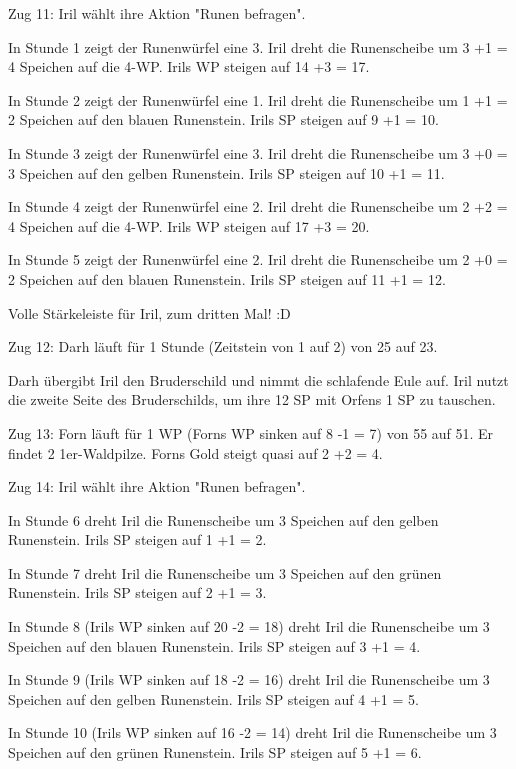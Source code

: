 \documentclass[10pt, a4paper, oneside]{book}
\begin{document}
{Zug 11: Iril wählt ihre Aktion "Runen befragen".

In Stunde 1 zeigt der Runenwürfel eine 3. Iril dreht die Runenscheibe um 3 +1 = 4 Speichen auf die 4-WP. Irils WP steigen auf 14 +3 = 17.

In Stunde 2 zeigt der Runenwürfel eine 1. Iril dreht die Runenscheibe um 1 +1 = 2 Speichen auf den blauen Runenstein. Irils SP steigen auf 9 +1 = 10.

In Stunde 3 zeigt der Runenwürfel eine 3. Iril dreht die Runenscheibe um 3 +0 = 3 Speichen auf den gelben Runenstein. Irils SP steigen auf 10 +1 = 11.

In Stunde 4 zeigt der Runenwürfel eine 2. Iril dreht die Runenscheibe um 2 +2 = 4 Speichen auf die 4-WP. Irils WP steigen auf 17 +3 = 20.

In Stunde 5 zeigt der Runenwürfel eine 2. Iril dreht die Runenscheibe um 2 +0 = 2 Speichen auf den blauen Runenstein. Irils SP steigen auf 11 +1 = 12.

Volle Stärkeleiste für Iril, zum dritten Mal! :D



Zug 12: Darh läuft für 1 Stunde (Zeitstein von 1 auf 2) von 25 auf 23.

Darh übergibt Iril den Bruderschild und nimmt die schlafende Eule auf. Iril nutzt die zweite Seite des Bruderschilds, um ihre 12 SP mit Orfens 1 SP zu tauschen.



Zug 13: Forn läuft für 1 WP (Forns WP sinken auf 8 -1 = 7) von 55 auf 51. Er findet 2 1er-Waldpilze. Forns Gold steigt quasi auf 2 +2 = 4.



Zug 14: Iril wählt ihre Aktion "Runen befragen".

In Stunde 6 dreht Iril die Runenscheibe um 3 Speichen auf den gelben Runenstein. Irils SP steigen auf 1 +1 = 2.

In Stunde 7 dreht Iril die Runenscheibe um 3 Speichen auf den grünen Runenstein. Irils SP steigen auf 2 +1 = 3.

In Stunde 8 (Irils WP sinken auf 20 -2 = 18) dreht Iril die Runenscheibe um 3 Speichen auf den blauen Runenstein. Irils SP steigen auf 3 +1 = 4.

In Stunde 9 (Irils WP sinken auf 18 -2 = 16) dreht Iril die Runenscheibe um 3 Speichen auf den gelben Runenstein. Irils SP steigen auf 4 +1 = 5.

In Stunde 10 (Irils WP sinken auf 16 -2 = 14) dreht Iril die Runenscheibe um 3 Speichen auf den grünen Runenstein. Irils SP steigen auf 5 +1 = 6.



}
\end{document}
